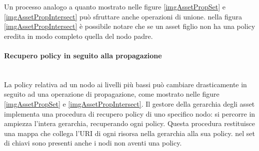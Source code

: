 \documentclass[12pt,a4paper,twoside]{book}
\begin{document}
Un processo analogo a quanto mostrato nelle figure \ref{imgAssetPropSet} e \ref{imgAssetPropIntersect} può sfruttare anche operazioni di unione. nella figura \ref{imgAssetPropIntersect} è possibile notare che se un asset figlio non ha una policy eredita in modo completo quella del nodo padre.
\paragraph{Recupero policy in seguito alla propagazione}\label{recuperoPolicy}\mbox{}\\
La policy relativa ad un nodo ai livelli più bassi può cambiare drasticamente in seguito ad una operazione di propagazione, come mostrato nelle figure \ref{imgAssetPropSet} e \ref{imgAssetPropIntersect}. Il gestore della gerarchia degli asset implementa una procedura di recupero policy di uno specifico nodo: si percorre in ampiezza l'intera gerarchia, recuperando ogni policy. Questa procedura restituisce una mappa che collega l'URI di ogni risorsa nella gerarchia alla sua policy. nel set di chiavi sono presenti anche i nodi non aventi una policy.
\end{document}
